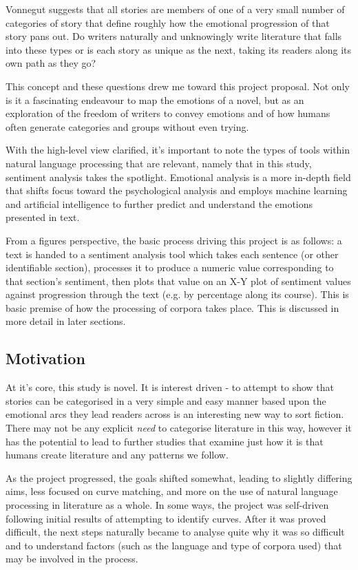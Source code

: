 \documentclass{article}
\begin{document}
        Vonnegut suggests that all stories are members of one of a very small number of categories of story that define roughly how the emotional progression of that story pans out. Do writers naturally and unknowingly write literature that falls into these types or is each story as unique as the next, taking its readers along its own path as they go?

        This concept and these questions drew me toward this project proposal. Not only is it a fascinating endeavour to map the emotions of a novel, but as an exploration of the freedom of writers to convey emotions and of how humans often generate categories and groups without even trying.

        With the high-level view clarified, it's important to note the types of tools within natural language processing that are relevant, namely that in this study, sentiment analysis takes the spotlight. Emotional analysis is a more in-depth field that shifts focus toward the psychological analysis \citep{sentimentVsEmotionAnalysis} and employs machine learning and artificial intelligence to further predict and understand the emotions presented in text.
        
        From a figures perspective, the basic process driving this project is as follows: a text is handed to a sentiment analysis tool which takes each sentence (or other identifiable section), processes it to produce a numeric value corresponding to that section's sentiment, then plots that value on an X-Y plot of sentiment values against progression through the text (e.g. by percentage along its course). This is basic premise of how the processing of corpora takes place. This is discussed in more detail in later sections.
    \subsection{Motivation}
        At it's core, this study is novel. It is interest driven - to attempt to show that stories can be categorised in a very simple and easy manner based upon the emotional arcs they lead readers across is an interesting new way to sort fiction. There may not be any explicit \textit{need} to categorise literature in this way, however it has the potential to lead to further studies that examine just how it is that humans create literature and any patterns we follow.

        As the project progressed, the goals shifted somewhat, leading to slightly differing aims, less focused on curve matching, and more on the use of natural language processing in literature as a whole. In some ways, the project was self-driven following initial results of attempting to identify curves. After it was proved difficult, the next steps naturally became to analyse quite why it was so difficult and to understand factors (such as the language and type of corpora used) that may be involved in the process.
\end{document}
